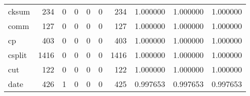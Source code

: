 \begin{longtable}{lrrrrrrrrr}
cksum     &                                                234 &                                                  0 &                                                  0 &                                                  0 &                                                  0 &                                                234 &                                           1.000000 &                               1.000000 &                             1.000000 \\
comm      &                                                127 &                                                  0 &                                                  0 &                                                  0 &                                                  0 &                                                127 &                                           1.000000 &                               1.000000 &                             1.000000 \\
cp        &                                                403 &                                                  0 &                                                  0 &                                                  0 &                                                  0 &                                                403 &                                           1.000000 &                               1.000000 &                             1.000000 \\
csplit    &                                               1416 &                                                  0 &                                                  0 &                                                  0 &                                                  0 &                                               1416 &                                           1.000000 &                               1.000000 &                             1.000000 \\
cut       &                                                122 &                                                  0 &                                                  0 &                                                  0 &                                                  0 &                                                122 &                                           1.000000 &                               1.000000 &                             1.000000 \\
date      &                                                426 &                                                  1 &                                                  0 &                                                  0 &                                                  0 &                                                425 &                                           0.997653 &                               0.997653 &                             0.997653 \\

\end{longtable}
